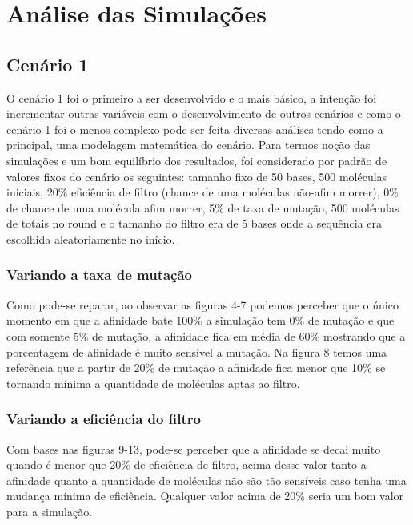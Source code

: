 \section{Análise das Simulações}

\subsection{Cenário 1}
O cenário 1 foi o primeiro a ser desenvolvido e o mais básico, a intenção foi
incrementar outras variáveis com o desenvolvimento de outros cenários e como o cenário
1 foi o menos complexo pode ser feita diversas análises tendo como a principal, uma
modelagem matemática do cenário. Para termos noção das simulações e um bom
equilíbrio dos resultados, foi considerado por padrão de valores fixos do cenário os
seguintes: tamanho fixo de 50 bases, 500 moléculas iniciais, 20\% eficiência de filtro
(chance de uma moléculas não-afim morrer), 0\% de chance de uma molécula afim morrer,
5\% de taxa de mutação, 500 moléculas de totais no round e o tamanho do filtro era de 5
bases onde a sequência era escolhida aleatoriamente no início.

\subsubsection{Variando a taxa de mutação}


Como pode-se reparar, ao observar as figuras 4-7 podemos perceber que o único
momento em que a afinidade bate 100\% a simulação tem 0\% de mutação e que com
somente 5\% de mutação, a afinidade fica em média de 60\% mostrando que a porcentagem
de afinidade é muito sensível a mutação. Na figura 8 temos uma referência que a partir
de 20\% de mutação a afinidade fica menor que 10\% se tornando mínima a quantidade de
moléculas aptas ao filtro.

\subsubsection{Variando a eficiência do filtro}


Com bases nas figuras 9-13, pode-se perceber que a afinidade se decai muito
quando é menor que 20\% de eficiência de filtro, acima desse valor tanto a afinidade
quanto a quantidade de moléculas não são tão sensíveis caso tenha uma mudança mínima
de eficiência. Qualquer valor acima de 20\% seria um bom valor para a simulação. 


